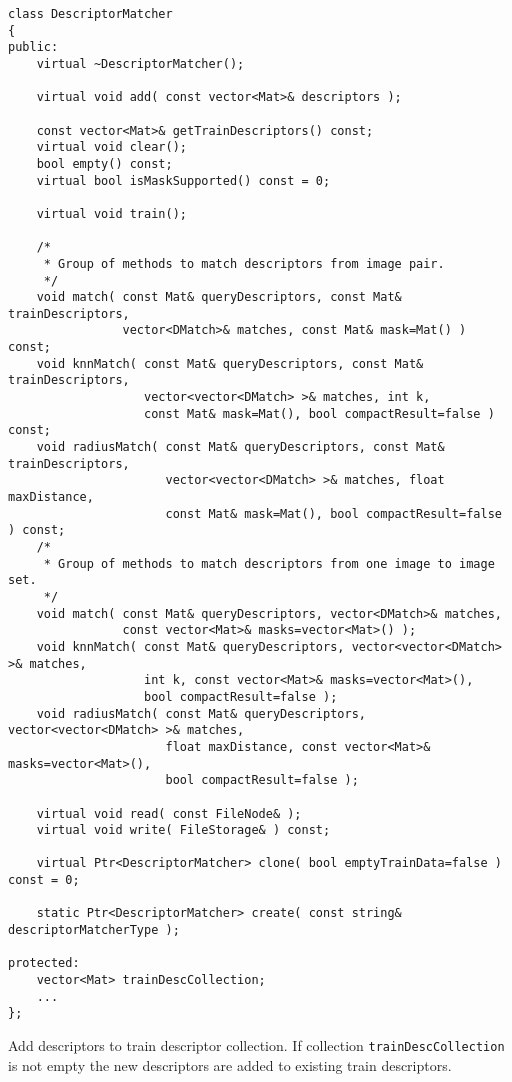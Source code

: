 \begin{lstlisting}
class DescriptorMatcher
{
public:
    virtual ~DescriptorMatcher();

    virtual void add( const vector<Mat>& descriptors );

    const vector<Mat>& getTrainDescriptors() const;
    virtual void clear();
    bool empty() const;
    virtual bool isMaskSupported() const = 0;

    virtual void train();
    
    /*
     * Group of methods to match descriptors from image pair.
     */
    void match( const Mat& queryDescriptors, const Mat& trainDescriptors,
                vector<DMatch>& matches, const Mat& mask=Mat() ) const;
    void knnMatch( const Mat& queryDescriptors, const Mat& trainDescriptors,
                   vector<vector<DMatch> >& matches, int k,
                   const Mat& mask=Mat(), bool compactResult=false ) const;
    void radiusMatch( const Mat& queryDescriptors, const Mat& trainDescriptors,
                      vector<vector<DMatch> >& matches, float maxDistance,
                      const Mat& mask=Mat(), bool compactResult=false ) const;
    /*
     * Group of methods to match descriptors from one image to image set.
     */
    void match( const Mat& queryDescriptors, vector<DMatch>& matches,
                const vector<Mat>& masks=vector<Mat>() );
    void knnMatch( const Mat& queryDescriptors, vector<vector<DMatch> >& matches, 
                   int k, const vector<Mat>& masks=vector<Mat>(), 
                   bool compactResult=false );
    void radiusMatch( const Mat& queryDescriptors, vector<vector<DMatch> >& matches, 
                      float maxDistance, const vector<Mat>& masks=vector<Mat>(), 
                      bool compactResult=false );

    virtual void read( const FileNode& );
    virtual void write( FileStorage& ) const;

    virtual Ptr<DescriptorMatcher> clone( bool emptyTrainData=false ) const = 0;
    
    static Ptr<DescriptorMatcher> create( const string& descriptorMatcherType );

protected:
    vector<Mat> trainDescCollection; 
    ...
};
\end{lstlisting} 

Add descriptors to train descriptor collection. If collection \texttt{trainDescCollection} is not empty
the new descriptors are added to existing train descriptors.


